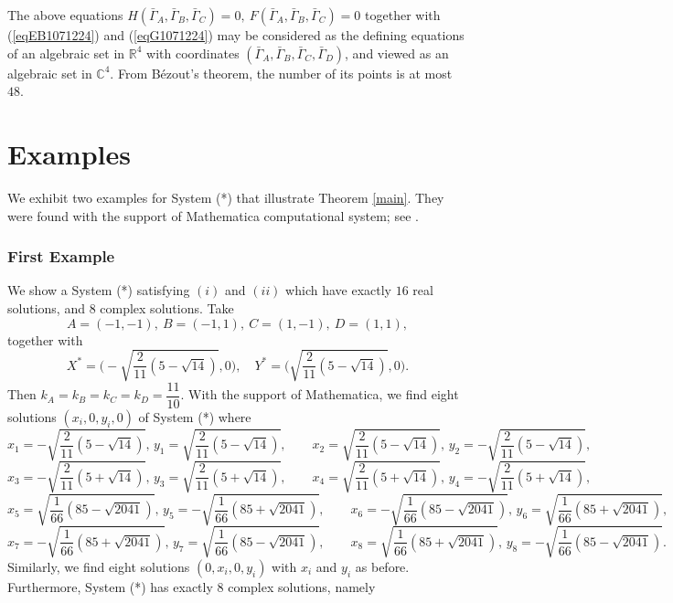 \documentclass[10pt]{amsart}
\theoremstyle{definition}
\theoremstyle{remark}
\begin{document}
The above equations $H(\bar{\Gamma}_A,\bar{\Gamma}_B,\bar{\Gamma}_C)=0,\  F(\bar{\Gamma}_A,\bar{\Gamma}_B,\bar{\Gamma}_C)=0$ together with (\ref{eqEB1071224}) and (\ref{eqG1071224}) may be considered as the defining equations of an algebraic set in $\mathbb{R}^4$ with coordinates $(\bar{\Gamma}_A,\bar{\Gamma}_B,\bar{\Gamma}_C,\bar{\Gamma}_D)$, and viewed as an algebraic set in $\mathbb{C}^4$. From B\'ezout's theorem, the number of its points is at most $48$. 




\section{Examples}
We exhibit two examples for System (*) that illustrate Theorem \ref{main}. They were found with the support of Mathematica computational system; see \cite{WR}. 
\label{exampl}
\subsubsection{First Example}
\label{seex}
We show a System (*) satisfying $(i)$ and $(ii)$ which have exactly $16$ real solutions, and $8$ complex solutions. 
Take
$$A=(-1,-1),\ B=(-1,1),\ C=(1,-1),\ D=(1,1),$$
together with $$X^*=\Big(-\sqrt{\frac{2}{11}(5-\sqrt{14})},0\Big),\quad Y^*=\Big(\sqrt{\frac{2}{11}(5-\sqrt{14})},0\Big).$$
Then $k_A=k_B=k_C=k_D=\dfrac{11}{10}$. With the support of Mathematica, we find eight solutions $(x_i,0,y_i,0)$ of System (*) where 
$$x_1=-\sqrt{\frac{2}{11}(5-\sqrt{14})},\,y_1=\sqrt{\frac{2}{11}(5-\sqrt{14})}, \qquad
x_2=\sqrt{\frac{2}{11}(5-\sqrt{14})},\,y_2=-\sqrt{\frac{2}{11}(5-\sqrt{14})},
$$
$$x_3=-\sqrt{\frac{2}{11}(5+\sqrt{14})},\,y_3=\sqrt{\frac{2}{11}(5+\sqrt{14})}, \qquad
x_4=\sqrt{\frac{2}{11}(5+\sqrt{14})},\,y_4=-\sqrt{\frac{2}{11}(5+\sqrt{14})},$$
$$x_5=\sqrt{\frac{1}{66}(85-\sqrt{2041})},\,y_5=-\sqrt{\frac{1}{66}(85+\sqrt{2041})}, \qquad 
x_6=-\sqrt{\frac{1}{66}(85-\sqrt{2041})},\,y_6=\sqrt{\frac{1}{66}(85+\sqrt{2041})},
$$
$$x_7=-\sqrt{\frac{1}{66}(85+\sqrt{2041})},\,y_7=\sqrt{\frac{1}{66}(85-\sqrt{2041})}, \qquad 
x_8=\sqrt{\frac{1}{66}(85+\sqrt{2041})},\,y_8=-\sqrt{\frac{1}{66}(85-\sqrt{2041})}.
$$
Similarly, we find eight solutions $(0,x_i,0,y_i)$  
with $x_i$ and $y_i$ as before. Furthermore, System (*) has exactly $8$ complex solutions, namely
\end{document}
